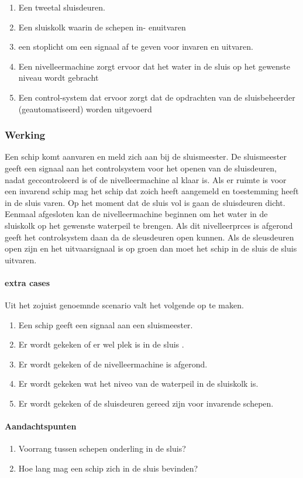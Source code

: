 \begin{enumerate}
	\item Een tweetal sluisdeuren. 
	\item Een sluiskolk waarin de schepen in- enuitvaren
	\item een stoplicht om een signaal af te geven voor invaren en uitvaren.
	\item Een nivelleermachine zorgt ervoor dat het water in de sluis op het gewenste niveau wordt gebracht
	\item Een control-system dat ervoor zorgt dat de opdrachten van de sluisbeheerder (geautomatiseerd) worden uitgevoerd
\end{enumerate}
\subsubsection{Werking}

Een schip komt aanvaren en meld zich aan bij de sluismeester. De sluismeester geeft een signaal aan het controlsystem voor het openen van de sluisdeuren, nadat geccontroleerd is of de nivelleermachine al klaar is. Als er ruimte is voor een invarend schip mag het schip dat zoich heeft aangemeld en toestemming heeft  in de sluis varen. Op het moment dat de sluis vol is gaan de sluisdeuren dicht. Eenmaal afgesloten kan de nivelleermachine beginnen om het water in de sluiskolk op het gewenste waterpeil te brengen. Als dit nivelleerprces is afgerond geeft  het controlsystem daan da de sleusdeuren open kunnen.  Als de sleusdeuren open zijn en het uitvaarsignaal is op groen dan moet het schip in de sluis de sluis uitvaren.
\paragraph{extra cases}
Uit het zojuist genoemnde scenario valt het volgende op te maken.
\begin{enumerate}
	\item Een schip geeft een signaal aan een sluismeester.
	\item Er wordt gekeken of er wel plek is in de sluis .
	\item Er wordt gekeken of de nivelleermachine is afgerond.
	\item Er wordt gekeken wat het niveo van de waterpeil in de sluiskolk is.
	\item Er wordt gekeken of de sluisdeuren gereed zijn voor invarende schepen.
\end{enumerate}
\paragraph{Aandachtspunten}
\begin{enumerate}
	\item Voorrang tussen schepen onderling in de sluis?
	\item Hoe lang mag een schip zich in de sluis bevinden?
\end{enumerate} 

